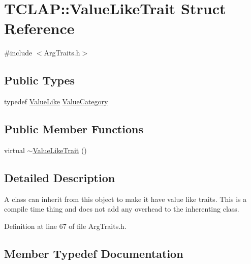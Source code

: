 \hypertarget{struct_t_c_l_a_p_1_1_value_like_trait}{}\section{T\+C\+L\+A\+P\+:\+:Value\+Like\+Trait Struct Reference}
\label{struct_t_c_l_a_p_1_1_value_like_trait}


{\ttfamily \#include $<$Arg\+Traits.\+h$>$}

\subsection*{Public Types}
\begin{DoxyCompactItemize}
\item 
typedef \hyperlink{struct_t_c_l_a_p_1_1_value_like}{Value\+Like} \hyperlink{struct_t_c_l_a_p_1_1_value_like_trait_aac4ee14f65926b8e741d797a8900a79a}{Value\+Category}
\end{DoxyCompactItemize}
\subsection*{Public Member Functions}
\begin{DoxyCompactItemize}
\item 
virtual \hyperlink{struct_t_c_l_a_p_1_1_value_like_trait_a829a0e0f46e61916f6c8aa6ee441df38}{$\sim$\+Value\+Like\+Trait} ()
\end{DoxyCompactItemize}


\subsection{Detailed Description}
A class can inherit from this object to make it have value like traits. This is a compile time thing and does not add any overhead to the inherenting class. 

Definition at line 67 of file Arg\+Traits.\+h.



\subsection{Member Typedef Documentation}
\hypertarget{struct_t_c_l_a_p_1_1_value_like_trait_aac4ee14f65926b8e741d797a8900a79a}{}

